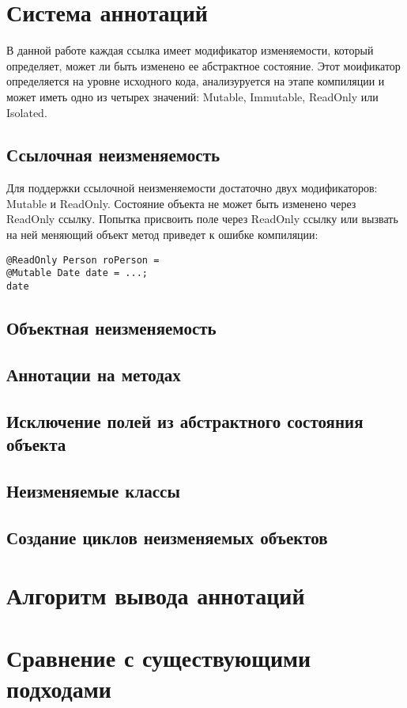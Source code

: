 \section{Система аннотаций}

В данной работе каждая ссылка имеет модификатор изменяемости, который определяет, может ли быть изменено ее абстрактное состояние. Этот моификатор определяется на уровне исходного кода, анализуруется на этапе компиляции и может иметь одно из четырех значений: Mutable, Immutable, ReadOnly или Isolated. 

\subsection{Ссылочная неизменяемость}

Для поддержки ссылочной неизменяемости достаточно двух модификаторов: Mutable и ReadOnly. Состояние объекта не может быть изменено через ReadOnly ссылку. Попытка присвоить поле через ReadOnly ссылку или вызвать на ней меняющий объект метод приведет к ошибке компиляции:

\begin{lstlisting}[caption=Mutable и RadOnly ссылки, label=code:mutable_vs_readonly]
@ReadOnly Person roPerson = 
@Mutable Date date = ...;
date
\end{lstlisting}

\subsection{Объектная неизменяемость}

\subsection{Аннотации на методах}

\subsection{Исключение полей из абстрактного состояния объекта}

\subsection{Неизменяемые классы}

\subsection{Создание циклов неизменяемых объектов}




\section{Алгоритм вывода аннотаций}

\section{Сравнение с существующими подходами}


